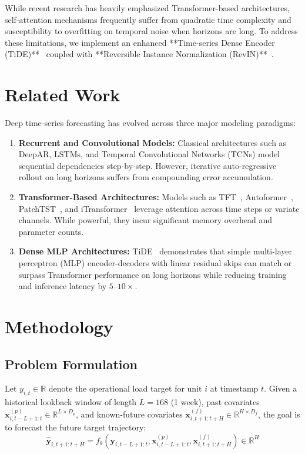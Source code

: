 \documentclass[11pt,a4paper]{article}
\begin{document}
While recent research has heavily emphasized Transformer-based architectures, self-attention mechanisms frequently suffer from quadratic time complexity and susceptibility to overfitting on temporal noise when horizons are long. To address these limitations, we implement an enhanced **Time-series Dense Encoder (TiDE)**~\cite{das2023tide} coupled with **Reversible Instance Normalization (RevIN)**~\cite{kim2022revin}.

\section{Related Work}
Deep time-series forecasting has evolved across three major modeling paradigms:
\begin{enumerate}
    \item \textbf{Recurrent and Convolutional Models:} Classical architectures such as DeepAR, LSTMs, and Temporal Convolutional Networks (TCNs) model sequential dependencies step-by-step. However, iterative auto-regressive rollout on long horizons suffers from compounding error accumulation.
    \item \textbf{Transformer-Based Architectures:} Models such as TFT~\cite{lim2021tft}, Autoformer~\cite{wu2021autoformer}, PatchTST~\cite{nie2023patchtst}, and iTransformer~\cite{liu2024itransformer} leverage attention across time steps or variate channels. While powerful, they incur significant memory overhead and parameter counts.
    \item \textbf{Dense MLP Architectures:} TiDE~\cite{das2023tide} demonstrates that simple multi-layer perceptron (MLP) encoder-decoders with linear residual skips can match or surpass Transformer performance on long horizons while reducing training and inference latency by $5\text{--}10\times$.
\end{enumerate}

\section{Methodology}

\subsection{Problem Formulation}
Let $y_{i, t} \in \mathbb{R}$ denote the operational load target for unit $i$ at timestamp $t$. Given a historical lookback window of length $L = 168$ (1 week), past covariates $\mathbf{x}_{i, t-L+1:t}^{(p)} \in \mathbb{R}^{L \times D_p}$, and known-future covariates $\mathbf{x}_{i, t+1:t+H}^{(f)} \in \mathbb{R}^{H \times D_f}$, the goal is to forecast the future target trajectory:
\begin{equation}
    \hat{\mathbf{y}}_{i, t+1:t+H} = f_\theta\left(\mathbf{y}_{i, t-L+1:t}, \mathbf{x}_{i, t-L+1:t}^{(p)}, \mathbf{x}_{i, t+1:t+H}^{(f)}\right) \in \mathbb{R}^H
\end{equation}
\end{document}
